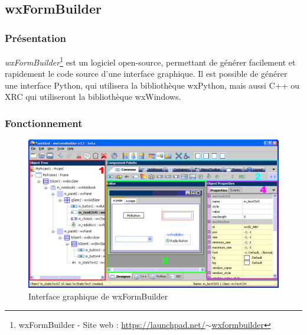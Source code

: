 
\subsection{wxFormBuilder}


\subsubsection{Présentation}

\textit{wxFormBuilder}\footnote{wxFormBuilder - Site web : \href{https://launchpad.net/~wxformbuilder}{https://launchpad.net/$\sim$wxformbuilder}} est un logiciel open-source, permettant de générer facilement et rapidement le code source d'une interface graphique.
Il est possible de générer une interface Python, qui utilisera la bibliothèque wxPython, mais aussi C++ ou XRC qui utiliseront la bibliothèque wxWindows.
\\




\subsubsection{Fonctionnement}

\begin{figure}[!h]
	\center
	\includegraphics[scale=0.5]{images/wxFormBuilder.png}
	\caption{Interface graphique de wxFormBuilder}
	\label{Interface graphique de wxFormBuilder}
\end{figure}

